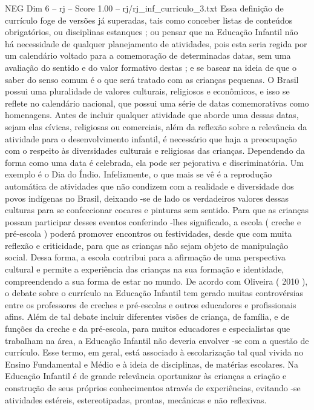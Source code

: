 \begin{textsample}{NEG Dim 6 – rj – Score 1.00 – rj/rj\_inf\_curriculo\_3.txt}  \label{ex:f6_neg_015}
Essa definição de currículo foge de versões já superadas, tais como conceber listas de conteúdos obrigatórios, ou disciplinas estanques ; ou pensar que na Educação Infantil não há necessidade de qualquer planejamento de atividades, pois esta seria regida por um calendário voltado para a comemoração de determinadas datas, sem uma avaliação do sentido e do valor formativo destas ; e se basear na ideia de que o saber do senso comum é o que será tratado com as crianças pequenas.
O Brasil possui uma pluralidade de valores culturais, religiosos e econômicos, e isso se reflete no calendário nacional, que possui uma série de datas comemorativas como homenagens.
Antes de incluir qualquer atividade que aborde uma dessas datas, sejam elas cívicas, religiosas ou comerciais, além da reflexão sobre a relevância da atividade para o desenvolvimento infantil, é necessário que haja a preocupação com o respeito às diversidades culturais e religiosas das crianças.
Dependendo da forma como uma data é celebrada, ela pode ser pejorativa e discriminatória.
Um exemplo é o Dia do Índio.
Infelizmente, o que mais se vê é a reprodução automática de atividades que não condizem com a realidade e diversidade dos povos indígenas no Brasil, deixando -se de lado os verdadeiros valores dessas culturas para se confeccionar cocares e pinturas sem sentido.
Para que as crianças possam participar desses eventos conferindo -lhes significado, a escola ( creche e pré-escola ) poderá promover encontros ou festividades, desde que com muita reflexão e criticidade, para que as crianças não sejam objeto de manipulação social.
Dessa forma, a escola contribui para a afirmação de uma perspectiva cultural e permite a experiência das crianças na sua formação e identidade, compreendendo a sua forma de estar no mundo.
De acordo com Oliveira ( 2010 ), o debate sobre o currículo na Educação Infantil tem gerado muitas controvérsias entre os professores de creches e pré-escolas e outros educadores e profissionais afins.
Além de tal debate incluir diferentes visões de criança, de família, e de funções da creche e da pré-escola, para muitos educadores e especialistas que trabalham na área, a Educação Infantil não deveria envolver -se com a questão de currículo.
Esse termo, em geral, está associado à escolarização tal qual vivida no Ensino Fundamental e Médio e à ideia de disciplinas, de matérias escolares.
Na Educação Infantil é de grande relevância oportunizar às crianças a criação e construção de seus próprios conhecimentos através de experiências, evitando -se atividades estéreis, estereotipadas, prontas, mecânicas e não reflexivas.

\end{textsample}
